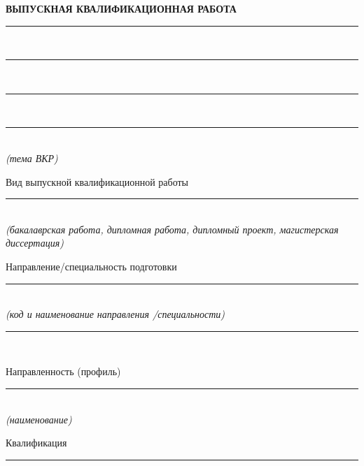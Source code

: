 \begin{center}
    \vspace{-3mm}
    \textbf{ВЫПУСКНАЯ КВАЛИФИКАЦИОННАЯ РАБОТА}\\[2mm]
    \rule[-1mm]{0.97\linewidth}{0.6pt}\\[-0.5mm]
    \rule[-1mm]{0.955\textwidth}{0.6pt}\\[-0.5mm]
    \rule[-1mm]{0.955\textwidth}{0.6pt}\\[-0.5mm]
    \rule[-1mm]{0.955\textwidth}{0.6pt}\\[-1mm]
    {\fontsize{11pt}{0pt}\selectfont\textit{(тема ВКР)}}\\
    \begin{flushleft}
        Вид выпускной квалификационной работы
        \vspace{-6mm}
    \end{flushleft}
    \rule[-1mm]{0.97\linewidth}{0.6pt}\\[-1.5mm]
    {\fontsize{10.7pt}{0pt}\selectfont\textit{(бакалаврская работа, дипломная работа,
        дипломный проект, магистерская диссертация)}}\\
    \begin{flushleft}
        Направление/специальность подготовки
        \vspace{-6mm}
    \end{flushleft}
    \rule[-1mm]{0.96\linewidth}{0.6pt}\\[-1.5mm]
    {\fontsize{10.7pt}{0pt}\selectfont\textit{(код и наименование направления
        /специальности)}}\\[-2.5mm]
    \rule[-1mm]{0.943\linewidth}{0.6pt}\\
    \begin{flushleft}
        \vspace{-6mm}
        Направленность (профиль)
        \vspace{-6mm}
    \end{flushleft}
    \rule[-1mm]{\linewidth}{0.6pt}\\[-1.5mm]
    {\fontsize{10.7pt}{0pt}\selectfont\textit{(наименование)}}\\[-3mm]
    \begin{flushleft}
        \vspace{-6mm}
        Квалификация\,\rule[-1mm]{13.25cm}{0.6pt}\\[-1.5mm]
        \\

\end{flushleft}
\end{center}
